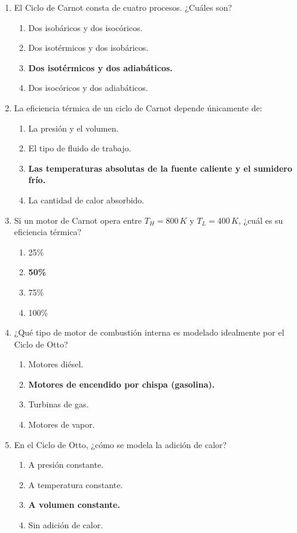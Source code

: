 \documentclass{article}
\begin{document}
\begin{enumerate}[label=\arabic*.]
    \item El Ciclo de Carnot consta de cuatro procesos. ¿Cuáles son?
    \begin{enumerate}[label=\alph*)]
        \item Dos isobáricos y dos isocóricos.
        \item Dos isotérmicos y dos isobáricos.
        \item \textbf{Dos isotérmicos y dos adiabáticos.}
        \item Dos isocóricos y dos adiabáticos.
    \end{enumerate}

    \item La eficiencia térmica de un ciclo de Carnot depende únicamente de:
    \begin{enumerate}[label=\alph*)]
        \item La presión y el volumen.
        \item El tipo de fluido de trabajo.
        \item \textbf{Las temperaturas absolutas de la fuente caliente y el sumidero frío.}
        \item La cantidad de calor absorbido.
    \end{enumerate}

    \item Si un motor de Carnot opera entre $T_H = 800 \, K$ y $T_L = 400 \, K$, ¿cuál es su eficiencia térmica?
    \begin{enumerate}[label=\alph*)]
        \item 25\%
        \item \textbf{50\%}
        \item 75\%
        \item 100\%
    \end{enumerate}

    \item ¿Qué tipo de motor de combustión interna es modelado idealmente por el Ciclo de Otto?
    \begin{enumerate}[label=\alph*)]
        \item Motores diésel.
        \item \textbf{Motores de encendido por chispa (gasolina).}
        \item Turbinas de gas.
        \item Motores de vapor.
    \end{enumerate}

    \item En el Ciclo de Otto, ¿cómo se modela la adición de calor?
    \begin{enumerate}[label=\alph*)]
        \item A presión constante.
        \item A temperatura constante.
        \item \textbf{A volumen constante.}
        \item Sin adición de calor.
    \end{enumerate}


\end{enumerate}
\end{document}
